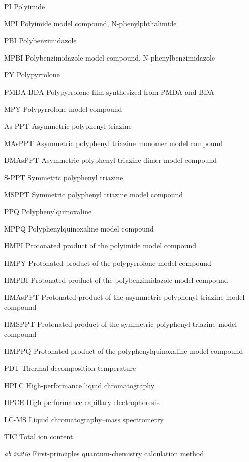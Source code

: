 \documentclass{thuthesis}
\begin{document}
\frontmatter

\tableofcontents
\listoffigures
\listoftables

\begin{denotation}[3cm]
\item[PI] Polyimide
\item[MPI] Polyimide model compound, N-phenylphthalimide
\item[PBI] Polybenzimidazole
\item[MPBI] Polybenzimidazole model compound, N-phenylbenzimidazole
\item[PY] Polypyrrolone
\item[PMDA-BDA] Polypyrrolone film synthesized from PMDA and BDA
\item[MPY] Polypyrrolone model compound
\item[As-PPT] Asymmetric polyphenyl triazine
\item[MAsPPT] Asymmetric polyphenyl triazine monomer model compound
\item[DMAsPPT] Asymmetric polyphenyl triazine dimer model compound
\item[S-PPT] Symmetric polyphenyl triazine
\item[MSPPT] Symmetric polyphenyl triazine model compound
\item[PPQ] Polyphenylquinoxaline
\item[MPPQ] Polyphenylquinoxaline model compound
\item[HMPI] Protonated product of the polyimide model compound
\item[HMPY] Protonated product of the polypyrrolone model compound
\item[HMPBI] Protonated product of the polybenzimidazole model compound
\item[HMAsPPT] Protonated product of the asymmetric polyphenyl
  triazine model compound
\item[HMSPPT] Protonated product of the symmetric polyphenyl triazine
  model compound
\item[HMPPQ] Protonated product of the polyphenylquinoxaline model compound
\item[PDT] Thermal decomposition temperature
\item[HPLC] High-performance liquid chromatography
\item[HPCE] High-performance capillary electrophoresis
\item[LC-MS] Liquid chromatography--mass spectrometry
\item[TIC] Total ion content
\item[\textit{ab initio}] First-principles quantum-chemistry calculation method

\end{denotation}
\end{document}

